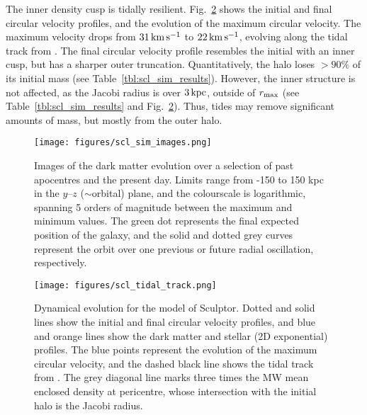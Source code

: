 The inner density cusp is tidally resilient.
Fig.~\ref{fig:scl_tidal_track} shows the initial and final circular
velocity profiles, and the evolution of the maximum circular velocity.
The maximum velocity drops from \(31\,{\rm km\,s^{-1}}\) to \(22\,{\rm km\,s^{-1}}\), evolving
along the tidal track from \citet{EN2021}. The final circular velocity
profile resembles the initial with an inner cusp, but has a sharper
outer truncation. Quantitatively, the halo loses \(>90\%\) of its
initial mass (see Table~\ref{tbl:scl_sim_results}). However, the inner
structure is not affected, as the Jacobi radius is over \(3\,{\rm kpc}\),
outside of \(r_{\rm max}\) (see Table~\ref{tbl:scl_sim_results} and
Fig.~\ref{fig:scl_tidal_track}). Thus, tides may remove significant
amounts of mass, but mostly from the outer halo.

\begin{figure}
\centering
\texttt{[image: figures/scl\_sim\_images.png]}
\caption[Sculptor simulation snapshots]{Images of the dark matter
evolution over a selection of past apocentres and the present day.
Limits range from -150 to 150 kpc in the \(y\)--\(z\) (\(\sim\)orbital)
plane, and the colourscale is logarithmic, spanning 5 orders of
magnitude between the maximum and minimum values. The green dot
represents the final expected position of the galaxy, and the solid and
dotted grey curves represent the orbit over one previous or future
radial oscillation, respectively.}\label{fig:scl_sim_images}
\end{figure}

\begin{figure}
\centering
\texttt{[image: figures/scl\_tidal\_track.png]}
\caption[Sculptor tidal tracks]{Dynamical evolution for the \smallperi{}
model of Sculptor. Dotted and solid lines show the initial and final
circular velocity profiles, and blue and orange lines show the dark
matter and stellar (2D exponential) profiles. The blue points represent
the evolution of the maximum circular velocity, and the dashed black
line shows the tidal track from \citet{EN2021}. The grey diagonal line
marks three times the MW mean enclosed density at pericentre, whose
intersection with the initial halo is the Jacobi
radius.}\label{fig:scl_tidal_track}
\end{figure}

